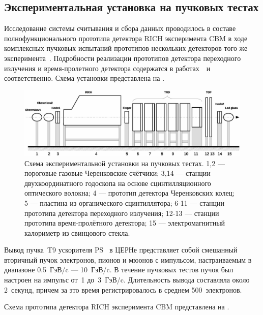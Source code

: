 \subsection{Экспериментальная установка на пучковых тестах}\label{section:secBeamtimeSetup}

Исследование системы считывания и сбора данных проводилось в составе полнофункционального прототипа детектора RICH эксперимента CBM в ходе комплексных пучковых испытаний прототипов нескольких детекторов того же эксперимента~\cite{BEAMTIME}. Подробности реализации прототипов детектора переходного излучения и время-пролетного детектора содержатся в работах~\cite{TRDBEAMTIME}~и~\cite{TOFBEAMTIME} соответственно. Схема установки представлена на .

\begin{figure}[H]
\centering
\includegraphics[width=1.0\textwidth]{pictures/Beamtime_setup_full_rev.eps}
\caption{Схема экспериментальной установки на пучковых тестах. 1,2 --- пороговые газовые Черенковские счётчики; 3,14 --- станции двухкоординатного годоскопа на основе сцинтилляционного оптического волокна; 4 --- прототип детектора Черенковских колец; 5 --- пластина из органического сцинтиллятора; 6-11 --- станции прототипа детектора переходного излучения; 12-13 --- станции прототипа время-пролётного детектора; 15 --- электромагнитный калориметр из свинцового стекла.}
\label{fig:Beamtime}
\end{figure}

Вывод пучка~T9 ускорителя PS~\cite{CERNPST9} в ЦЕРНе представляет собой смешанный вторичный пучок электронов, пионов и мюонов с импульсом, настраиваемым в диапазоне 0.5~ГэВ/c --- 10~ГэВ/c. В течение пучковых тестов пучок был настроен на импульс от~1 до~3~ГэВ/c. Длительность вывода составляла около 2~секунд, причем за это время регистрировалось в среднем 500~электронов.

Схема прототипа детектора RICH эксперимента CBM представлена на .

